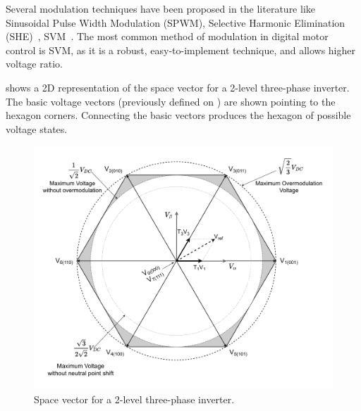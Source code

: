 \documentclass[9pt,conference]{IEEEtran}
\begin{document}
Several modulation techniques have been proposed in the literature like Sinusoidal Pulse Width Modulation (SPWM), Selective Harmonic Elimination (SHE)~\cite{Asadzadeh:selective_harmonic_elimination:2019}, SVM~\cite{Neacsu:SVM_intro:2001:IECON}.
The most common method of modulation in digital motor control is SVM, as it is a robust, easy-to-implement technique, and allows higher voltage ratio. 

 shows a 2D representation of the space vector for a 2-level three-phase inverter. The basic voltage vectors (previously defined on ) are shown pointing to the hexagon corners. 
 Connecting the basic vectors produces the hexagon of possible voltage states.

\begin{figure}[!htb]
	\centering
	\includegraphics[width=1\linewidth]{Figures/Space_Vector_revised.pdf}
	\caption[Space vector for a 2-level three-phase inverter.]{Space vector for a 2-level three-phase inverter.}
	\label{fig:space_vector}%
\end{figure}
\end{document}
